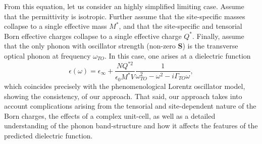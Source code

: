 \documentclass[aps,prb,twocolumn,
	groupedaddress,superscriptaddress,
	amsfonts,amssymb,amsmath,floatfix,
	citeautoscript]{revtex4-1}
\begin{document}
From this equation, let us consider an highly simplified limiting case. Assume that the permittivity is isotropic. Further assume that the site-specific masses collapse to a single effective mass $M^*$, and that the site-specific and tensorial Born effective charges collapse to a single effective charge $Q^*$. Finally, assume that the only phonon with oscillator strength (non-zero $\mathbf{S}$) is the transverse optical phonon at frequency $\omega_{TO}$. In this case, one arises at a dielectric function 
\begin{equation}\label{eq:lorentzoscillator}
\epsilon(\omega) = \epsilon_{\infty} + \frac{NQ^{*2}}{\epsilon_0 M^*V}\frac{1}{\omega^2_{TO}-\omega^2-i\Gamma_{TO}\omega},
\end{equation}
which coincides precisely with the phenomenological Lorentz oscillator model, showing the consistency, of our approach. That said, our approach takes into account complications arising from the tensorial and site-dependent nature of the Born charges, the effects of a complex unit-cell, as well as a detailed understanding of the phonon band-structure and how it affects the features of the predicted dielectric function.
\end{document}

